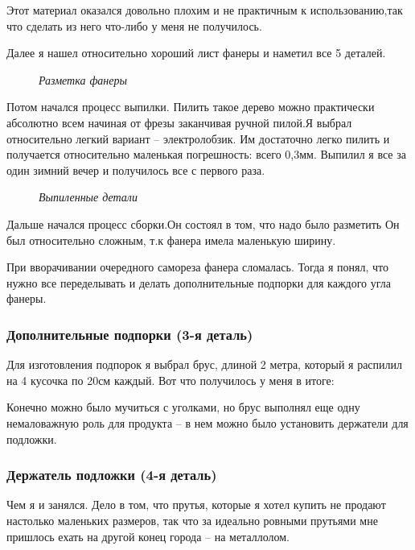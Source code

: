 \documentclass[a4paper, 12pt]{article}
\newcommand{\image}[3]{
	\begin{figure}[ht]
		\center{\texttt{[image: img/\#1]} }
		\caption{\textit{#3}}\end{figure}
}
\begin{document}
Этот материал оказался довольно плохим и не практичным к использованию,так что
сделать из него что-либо у меня не получилось.


Далее я нашел относительно хороший лист фанеры и наметил все 5 деталей.

\image{разметка фанеры.jpg}{180}{Разметка фанеры}

Потом начался процесс выпилки. Пилить такое дерево можно практически абсолютно
всем начиная от фрезы заканчивая ручной пилой.Я выбрал относительно легкий
вариант -- электролобзик. Им достаточно легко пилить и получается относительно
маленькая погрешность: всего 0,3мм. Выпилил я все за один зимний вечер и
получилось все с первого раза.

\image{разметка фанеры.jpg}{180}{Выпиленные детали}

Дальше начался процесс сборки.Он состоял в том, что надо было разметить  Он был
относительно сложным, т.к фанера имела маленькую ширину.


При вворачивании очередного самореза фанера сломалась. Тогда
я понял, что нужно все переделывать и делать дополнительные подпорки для
каждого угла фанеры.

\subsubsection{Дополнительные подпорки (3-я деталь)}

Для изготовления подпорок я выбрал брус, длиной 2 метра, который я распилил
на 4 кусочка по 20см каждый. Вот что получилось у меня в итоге:


Конечно можно было мучиться с уголками, но брус выполнял еще одну немаловажную
роль для продукта -- в нем можно было установить держатели для подложки.

\subsubsection{Держатель подложки (4-я деталь)}

Чем я и занялся. Дело в том, что прутья, которые я хотел купить не продают
настолько маленьких размеров, так что за идеально ровными прутьями мне пришлось
ехать на другой конец города -- на металлолом.

\end{document}

